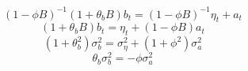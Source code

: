 


\begin{equation}
    \label{eq:w-y-a_notheta}
    (1 - \phi B)^{-1}(1 + \theta_bB)b_t = (1-\phi B)^{-1}\eta_t + a_t 
\end{equation}
\begin{equation}
    \label{eq:w-y-a_notheta2}
    (1 + \theta_bB)b_t = \eta_t + (1 - \phi B)a_t 
\end{equation}
\begin{equation}
    \label{eq:H_notheta1}
    (1 + \theta_b^2)\sigma_b^2 = \sigma_\eta^2 + (1 + \phi^2)\sigma_a^2 
\end{equation}
\begin{equation}
    \label{eq:H_notheta1}
    \theta_b\sigma_b^2 = -\phi\sigma_a^2 
\end{equation}



